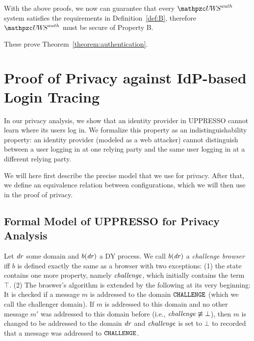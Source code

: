 \begin{theorem}
 
  With the above proofs, we now can guarantee that every 
  $\uppressoauthwebsystem$ system satisfies the requirements in 
  Definition~\ref{def:B}, therefore $\uppressoauthwebsystem$ 
  must be secure of Property B.
  
  These prove Theorem~\ref{theorem:authentication}.\QED
  
  \section{Proof of Privacy against IdP-based Login Tracing}
  
  In our privacy analysis, we show that an identity provider in UPPRESSO cannot learn 
  where its users log in. We formalize this property as an indistinguishability 
  property: an identity provider (modeled as a web attacker) cannot distinguish 
  between a user logging in at one relying party and the same user logging in at 
  a different relying party.
  
  We will here first describe the precise model that we use for privacy.
  After that, we define an equivalence relation between configurations,
  which we will then use in the proof of privacy.
  
  \subsection{Formal Model of UPPRESSO for Privacy Analysis}
  
  \begin{definition}
    Let $\mathit{dr}$ some domain and $b(\mathit{dr})$ a DY process. 
    We call $b(\mathit{dr})$ a \emph{challenge browser} iff $b$
    is defined exactly the same as a browser with two exceptions: 
    (1) the state contains one more property, namely 
    $\mathit{challenge}$, which initially contains the term $\top$. 
    (2) The broswer's algorithm is extended by the following at 
    its very beginning: It is checked if a message $m$ is 
    addressed to the domain $\mathtt{CHALLENGE}$ (which we call the 
    challenger domain). If $m$ is addressed to this domain and 
    no other message $m'$ was addressed to this domain before 
    (i.e., $\mathit{challenge} \not\equiv \bot$), then $m$ is changed 
    to be addressed to the domain $\mathit{dr}$ and $\mathit{challenge}$ 
    is set to $\bot$ to recorded that a message was addressed to 
    $\mathtt{CHALLENGE}$.
  \end{definition}
  

\end{theorem}
